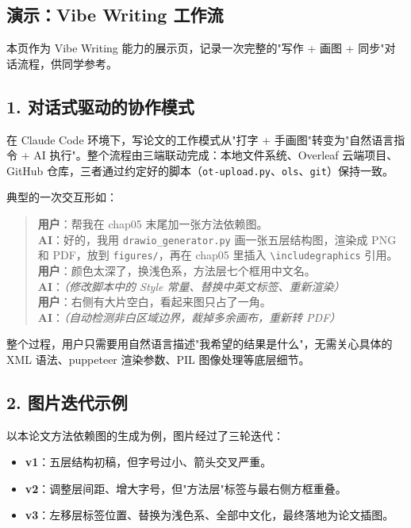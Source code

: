 
\begin{acknowledgements}

\section*{演示：Vibe Writing 工作流}

本页作为 Vibe Writing 能力的展示页，记录一次完整的"写作 + 画图 + 同步"对话流程，供同学参考。

\subsection*{1. 对话式驱动的协作模式}

在 Claude Code 环境下，写论文的工作模式从"打字 + 手画图"转变为"自然语言指令 + AI 执行"。整个流程由三端联动完成：本地文件系统、Overleaf 云端项目、GitHub 仓库，三者通过约定好的脚本（\texttt{ot-upload.py}、\texttt{ols}、\texttt{git}）保持一致。

典型的一次交互形如：

\begin{quote}
\textbf{用户}：帮我在 chap05 末尾加一张方法依赖图。\\
\textbf{AI}：好的，我用 \texttt{drawio\_generator.py} 画一张五层结构图，渲染成 PNG 和 PDF，放到 \texttt{figures/}，再在 chap05 里插入 \texttt{\textbackslash includegraphics} 引用。\\
\textbf{用户}：颜色太深了，换浅色系，方法层七个框用中文名。\\
\textbf{AI}：\emph{（修改脚本中的 Style 常量、替换中英文标签、重新渲染）}\\
\textbf{用户}：右侧有大片空白，看起来图只占了一角。\\
\textbf{AI}：\emph{（自动检测非白区域边界，裁掉多余画布，重新转 PDF）}
\end{quote}

整个过程，用户只需要用自然语言描述"我希望的结果是什么"，无需关心具体的 XML 语法、puppeteer 渲染参数、PIL 图像处理等底层细节。

\subsection*{2. 图片迭代示例}

以本论文方法依赖图的生成为例，图片经过了三轮迭代：

\begin{itemize}
    \item \textbf{v1}：五层结构初稿，但字号过小、箭头交叉严重。
    \item \textbf{v2}：调整层间距、增大字号，但"方法层"标签与最右侧方框重叠。
    \item \textbf{v3}：左移层标签位置、替换为浅色系、全部中文化，最终落地为论文插图。
\end{itemize}


\end{acknowledgements}
